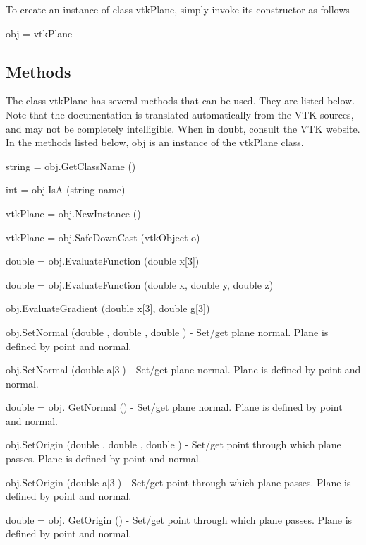 To create an instance of class vtk\-Plane, simply invoke its constructor as follows \begin{DoxyVerb}  obj = vtkPlane
\end{DoxyVerb}
 \hypertarget{vtkwidgets_vtkxyplotwidget_Methods}{}\subsection{Methods}\label{vtkwidgets_vtkxyplotwidget_Methods}
The class vtk\-Plane has several methods that can be used. They are listed below. Note that the documentation is translated automatically from the V\-T\-K sources, and may not be completely intelligible. When in doubt, consult the V\-T\-K website. In the methods listed below, {\ttfamily obj} is an instance of the vtk\-Plane class. 
\begin{DoxyItemize}
\item {\ttfamily string = obj.\-Get\-Class\-Name ()}  
\item {\ttfamily int = obj.\-Is\-A (string name)}  
\item {\ttfamily vtk\-Plane = obj.\-New\-Instance ()}  
\item {\ttfamily vtk\-Plane = obj.\-Safe\-Down\-Cast (vtk\-Object o)}  
\item {\ttfamily double = obj.\-Evaluate\-Function (double x\mbox{[}3\mbox{]})}  
\item {\ttfamily double = obj.\-Evaluate\-Function (double x, double y, double z)}  
\item {\ttfamily obj.\-Evaluate\-Gradient (double x\mbox{[}3\mbox{]}, double g\mbox{[}3\mbox{]})}  
\item {\ttfamily obj.\-Set\-Normal (double , double , double )} -\/ Set/get plane normal. Plane is defined by point and normal.  
\item {\ttfamily obj.\-Set\-Normal (double a\mbox{[}3\mbox{]})} -\/ Set/get plane normal. Plane is defined by point and normal.  
\item {\ttfamily double = obj. Get\-Normal ()} -\/ Set/get plane normal. Plane is defined by point and normal.  
\item {\ttfamily obj.\-Set\-Origin (double , double , double )} -\/ Set/get point through which plane passes. Plane is defined by point and normal.  
\item {\ttfamily obj.\-Set\-Origin (double a\mbox{[}3\mbox{]})} -\/ Set/get point through which plane passes. Plane is defined by point and normal.  
\item {\ttfamily double = obj. Get\-Origin ()} -\/ Set/get point through which plane passes. Plane is defined by point and normal.  

\end{DoxyItemize}
